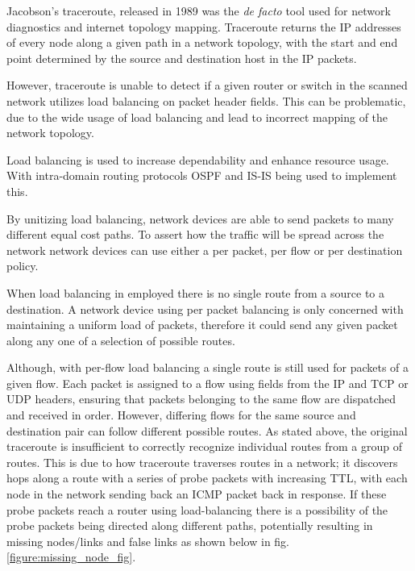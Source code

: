 
Jacobson's traceroute, released in 1989 was the \textit{de facto} tool used for network diagnostics and internet topology mapping.
Traceroute returns the IP addresses of every node along a given path in a network topology, with the start and end point determined by the source and destination host in the IP packets.\cite{jacobson1989traceroute}

However, traceroute is unable to detect if a given router or switch in the scanned network utilizes load balancing on packet header fields. This can be problematic, due to the wide usage of load balancing and lead to incorrect mapping of the network topology.\cite{anomalies}\cite{exhaustive}

Load balancing is used to increase dependability and enhance resource usage. With intra-domain routing protocols OSPF\cite{moyospf} and IS-IS\cite{isis} being used to implement this. 

By unitizing load balancing, network devices are able to send packets to many different equal cost paths. To assert how the traffic will be spread across the network network devices can use either a per packet, per flow or per destination policy. \cite{cisco}\cite{juniper} 

When load balancing in employed there is no single route from a source to a destination. A network device using per packet balancing is only concerned with maintaining a uniform load of packets, therefore it could send any given packet along any one of a selection of possible routes.\cite{anomalies}

Although, with per-flow load balancing a single route is still used for packets of a given flow. Each packet is assigned to a flow using fields from the IP and TCP or UDP headers, ensuring that packets belonging to the same flow are dispatched and received in order. However, differing flows for the same source and destination pair can follow different possible routes.\cite{anomalies} 
As stated above, the original traceroute is insufficient to correctly recognize individual routes from a group of routes. This is due to how traceroute traverses routes in a network; it discovers hops along a route with a series of probe packets with increasing TTL, with each node in the network sending back an ICMP packet back in response. If these probe packets reach a router using load-balancing there is a possibility of the probe packets being directed along different paths, potentially resulting in missing nodes/links and false links as shown below in fig. \ref{figure:missing_node_fig}.

